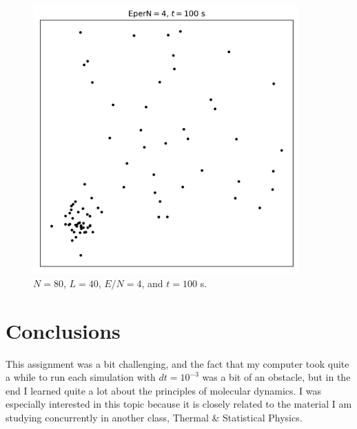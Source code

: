 \documentclass{article}
\begin{document}
\begin{figure}[H]
    \centering
    \includegraphics[width=4in]{homework8/p1b.png}
    \caption{$N=80$, $L=40$, $E/N=4$, and $t=100$ s.}
    \label{fig:1b}
\end{figure}

\bigskip
{}
\medskip



\bigskip
{}
\medskip



\bigskip
{}
\medskip



\section{Conclusions}

This assignment was a bit challenging, and the fact that my computer took quite a while to run each simulation with $dt=10^{-3}$ was a bit of an obstacle, but in the end I learned quite a lot about the principles of molecular dynamics. I was especially interested in this topic because it is closely related to the material I am studying concurrently in another class, Thermal \& Statistical Physics.
\end{document}
